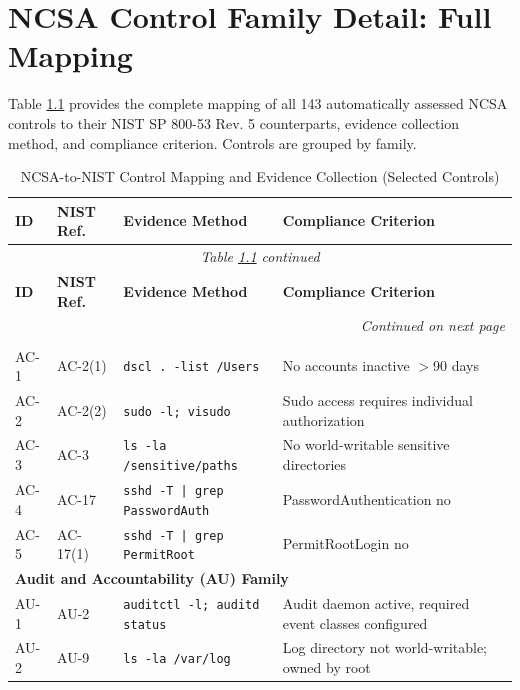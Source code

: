\documentclass[12pt,oneside]{report}
\newcommand{\chapterlabel}{CHAPTER}
\begin{document}
\appendix
\renewcommand{\chapterlabel}{APPENDIX}
\chapter{NCSA Control Family Detail: Full Mapping}

Table \ref{tab:ncsa_full_mapping} provides the complete mapping of all 143 automatically assessed NCSA controls to their NIST SP 800-53 Rev. 5 counterparts, evidence collection method, and compliance criterion. Controls are grouped by family.

\begin{longtable}{|p{1.2cm}|p{1.8cm}|p{3.5cm}|p{4.5cm}|}
\caption{NCSA-to-NIST Control Mapping and Evidence Collection (Selected Controls)}
\label{tab:ncsa_full_mapping} \\
\hline
\textbf{ID} & \textbf{NIST Ref.} & \textbf{Evidence Method} & \textbf{Compliance Criterion} \\
\hline
\endfirsthead
\multicolumn{4}{c}{\textit{Table \ref{tab:ncsa_full_mapping} continued}} \\
\hline
\textbf{ID} & \textbf{NIST Ref.} & \textbf{Evidence Method} & \textbf{Compliance Criterion} \\
\hline
\endhead
\hline
\multicolumn{4}{r}{\textit{Continued on next page}} \\
\endfoot
\hline
\endlastfoot
\multicolumn{4}{l}{\textbf{Access Control (AC) Family}} \\[4pt]
AC-1 & AC-2(1) & \texttt{dscl . -list /Users} & No accounts inactive $>$90 days \\
AC-2 & AC-2(2) & \texttt{sudo -l; visudo} & Sudo access requires individual authorization \\
AC-3 & AC-3 & \texttt{ls -la /sensitive/paths} & No world-writable sensitive directories \\
AC-4 & AC-17 & \texttt{sshd -T | grep PasswordAuth} & PasswordAuthentication no \\
AC-5 & AC-17(1) & \texttt{sshd -T | grep PermitRoot} & PermitRootLogin no \\[8pt]
\multicolumn{4}{l}{\textbf{Audit and Accountability (AU) Family}} \\[4pt]
AU-1 & AU-2 & \texttt{auditctl -l; auditd status} & Audit daemon active, required event classes configured \\
AU-2 & AU-9 & \texttt{ls -la /var/log} & Log directory not world-writable; owned by root \\

\end{longtable}
\end{document}
